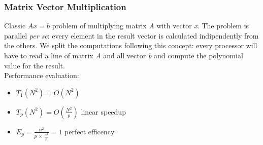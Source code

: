 \documentclass{article}
\begin{document}
			\subsubsection{Matrix Vector Multiplication}
				Classic $Ax = b$ problem of multiplying matrix \emph{A} with vector \emph{x}. The problem is parallel \textit{per se}: every element in the result vector is calculated indipendently from the others. We split the computations following this concept: every processor will have to read a line of matrix \emph{A} and all vector \emph{b} and compute the polynomial value for the result.\\
				Performance evaluation:
				\begin{itemize}
					\item $T_1(N^2) = O(N^2)$
					\item $T_p(N^2) = O(\frac{N^2}{p})$ linear speedup
					\item $E_p = \frac{n^2}{p\, \times\, \frac{n^2}{p}} = 1$ perfect efficency
				\end{itemize}
\end{document}

